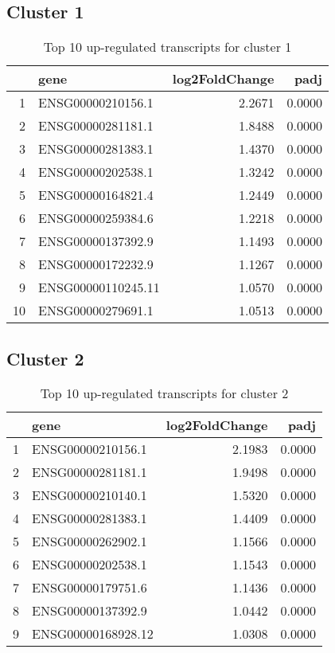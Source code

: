\documentclass{article}
\begin{document}
\subsection{Cluster 1 }
\begin{table}[H]
\centering
\begin{tabularx}{\textwidth}{rlrr}
  \hline
 & gene & log2FoldChange & padj \\ 
  \hline
1 & ENSG00000210156.1 & 2.2671 & 0.0000 \\ 
  2 & ENSG00000281181.1 & 1.8488 & 0.0000 \\ 
  3 & ENSG00000281383.1 & 1.4370 & 0.0000 \\ 
  4 & ENSG00000202538.1 & 1.3242 & 0.0000 \\ 
  5 & ENSG00000164821.4 & 1.2449 & 0.0000 \\ 
  6 & ENSG00000259384.6 & 1.2218 & 0.0000 \\ 
  7 & ENSG00000137392.9 & 1.1493 & 0.0000 \\ 
  8 & ENSG00000172232.9 & 1.1267 & 0.0000 \\ 
  9 & ENSG00000110245.11 & 1.0570 & 0.0000 \\ 
  10 & ENSG00000279691.1 & 1.0513 & 0.0000 \\ 
   \hline
\end{tabularx}
\caption{Top 10 up-regulated transcripts for cluster 1} 
\label{tab:q3_1_1}
\end{table}
\subsection{Cluster 2 }
\begin{table}[H]
\centering
\begin{tabularx}{\textwidth}{rlrr}
  \hline
 & gene & log2FoldChange & padj \\ 
  \hline
1 & ENSG00000210156.1 & 2.1983 & 0.0000 \\ 
  2 & ENSG00000281181.1 & 1.9498 & 0.0000 \\ 
  3 & ENSG00000210140.1 & 1.5320 & 0.0000 \\ 
  4 & ENSG00000281383.1 & 1.4409 & 0.0000 \\ 
  5 & ENSG00000262902.1 & 1.1566 & 0.0000 \\ 
  6 & ENSG00000202538.1 & 1.1543 & 0.0000 \\ 
  7 & ENSG00000179751.6 & 1.1436 & 0.0000 \\ 
  8 & ENSG00000137392.9 & 1.0442 & 0.0000 \\ 
  9 & ENSG00000168928.12 & 1.0308 & 0.0000 \\ 
   \hline
\end{tabularx}
\caption{Top 10 up-regulated transcripts for cluster 2} 
\label{tab:q3_1_2}
\end{table}
\end{document}
